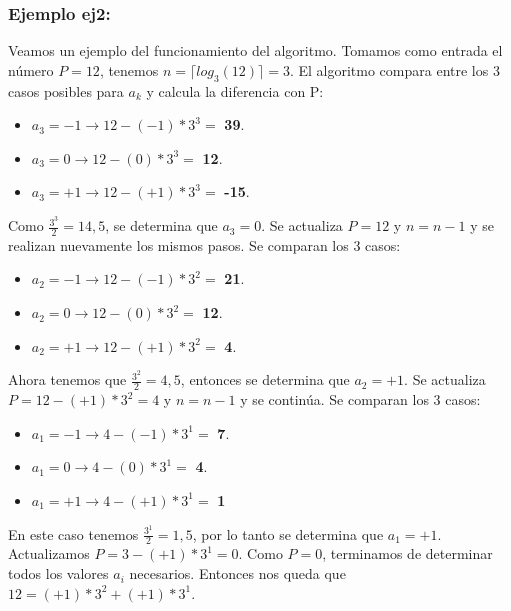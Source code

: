 \subsubsection{Ejemplo ej2:}

\par Veamos un ejemplo del funcionamiento del algoritmo. Tomamos como entrada el número $P = 12$, tenemos $n = \lceil log_{3}(12) \rceil = 3$. El algoritmo compara entre los 3 casos posibles para $a_{k}$ y calcula la diferencia con P:

\begin{itemize}
	\item $a_{3} = -1 \rightarrow  12 - (-1) * 3^{3} =$ \textbf{39}.
	\item $a_{3} = 0 \rightarrow  12 - (0) * 3^{3} =$ \textbf{12}.
	\item $a_{3} = +1 \rightarrow  12 - (+1) * 3^{3} =$ \textbf{-15}.
\end{itemize}
\par Como $\frac{3^{3}}{2} = 14,5$, se determina que $a_{3} = 0$. Se actualiza $P = 12$ y $n = n - 1$ y se realizan nuevamente los mismos pasos. Se comparan los 3 casos:

\begin{itemize}
	\item $a_{2} = -1 \rightarrow  12 - (-1) * 3^{2} =$ \textbf{21}.
	\item $a_{2} = 0 \rightarrow  12 - (0) * 3^{2} =$ \textbf{12}.
	\item $a_{2} = +1 \rightarrow  12 - (+1) * 3^{2} =$ \textbf{4}.
\end{itemize}
\par Ahora tenemos que $\frac{3^{2}}{2} = 4,5$, entonces se determina que $a_{2} = +1$. Se actualiza $P = 12 - (+1) * 3^{2} = 4$ y $n = n - 1$ y se continúa. Se comparan los 3 casos:

\begin{itemize}
	\item $a_{1} = -1 \rightarrow  4 - (-1) * 3^{1} =$ \textbf{7}.
	\item $a_{1} = 0 \rightarrow  4 - (0) * 3^{1} =$ \textbf{4}.
	\item $a_{1} = +1 \rightarrow  4 - (+1) * 3^{1} =$ \textbf{1}
\end{itemize}
\par En este caso tenemos $\frac{3^{1}}{2} = 1,5$, por lo tanto se determina que $a_{1} = +1$. Actualizamos $P = 3 - (+1) * 3^{1} = 0$. Como $P=0$, terminamos de determinar todos los valores $a_{i}$ necesarios. Entonces nos queda que $12 = (+1) * 3^{2} + (+1) * 3^{1}$.

